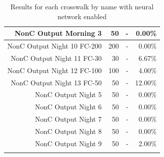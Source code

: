 \documentclass[12pt]{ucthesis}
\begin{document}
\begin{longtable}{|r|r|r|r|}
    \hline
    NonC Output Morning 3 & 50 & -  & 0.00\% \bigstrut\\
    \hline
    NonC Output Night 10 FC-200 & 200 & -  & 0.00\% \bigstrut\\
    \hline
    NonC Output Night 11 FC-30 & 30 & -  & 6.67\% \bigstrut\\
    \hline
    NonC Output Night 12 FC-100 & 100 & -  & 4.00\% \bigstrut\\
    \hline
    NonC Output Night 13 FC-50 & 50 & -  & 12.00\% \bigstrut\\
    \hline
    NonC Output Night 5 & 50 & -  & 0.00\% \bigstrut\\
    \hline
    NonC Output Night 6 & 50 & -  & 0.00\% \bigstrut\\
    \hline
    NonC Output Night 7 & 50 & -  & 0.00\% \bigstrut\\
    \hline
    NonC Output Night 8 & 50 & -  & 0.00\% \bigstrut\\
    \hline
    NonC Output Night 9 & 50 & -  & 2.00\% \bigstrut\\
    \hline

    \caption{Results for each crosswalk by name with neural network enabled}
    \label{tab:appendixcrosswalkresults} 
    \end{longtable}
\end{document}
